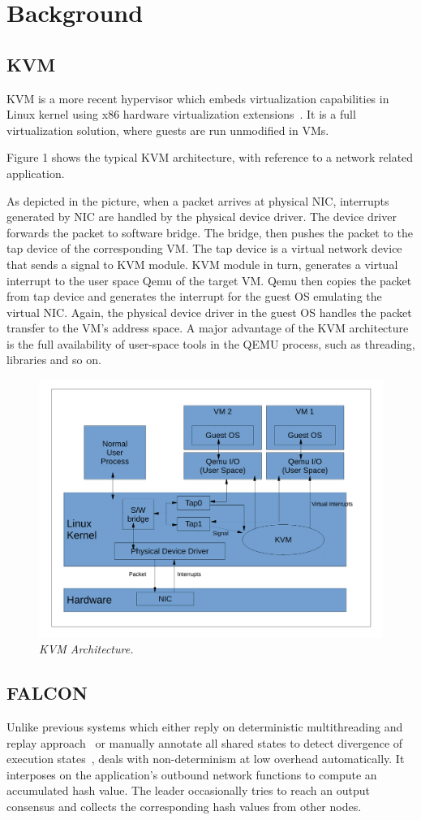 \section{Background} \label{sec:background}

\subsection{KVM} \label{sec:kvm}

KVM is a more recent hypervisor which embeds virtualization capabilities 
in Linux kernel using x86 hardware virtualization extensions~\cite{kivity2007kvm}. 
It is a full virtualization solution, where guests are run unmodified in VMs. 

Figure 1 shows the typical KVM architecture, with reference to a network related
application. 

As depicted in the picture, when a packet arrives at physical NIC,
interrupts generated by NIC are handled by the physical device driver. The device
driver forwards the packet to software bridge. The bridge, then pushes the packet
to the tap device of the corresponding VM. The tap device is a virtual network
device that sends a signal to KVM module. KVM module in turn, generates a virtual
interrupt to the user space Qemu of the target VM. Qemu then copies the packet from
tap device and generates the interrupt for the guest OS emulating the virtual NIC.
Again, the physical device driver in the guest OS handles the packet transfer to
the VM’s address space. A major advantage of the KVM architecture is the full
availability of user-space tools in the QEMU process, such as threading, libraries
and so on.

\begin{figure}[t]
\centering
\includegraphics[width=.47\textwidth]{figures/kvm}
\vspace{-.2in}
\caption{{\em KVM Architecture.}} \label{fig:kvm}
\vspace{.05in}
\end{figure}

\subsection{FALCON} \label{sec:falcon}
Unlike previous \smr systems which either reply on deterministic multithreading and replay
approach~\cite{rex:eurosys14} or manually annotate all shared states to detect divergence of 
execution states~\cite{eve:osdi12}, \smrsystem deals with non-determinism at low overhead 
automatically. It interposes on the application's outbound network functions to compute an 
accumulated hash value. The leader occasionally tries to reach an output consensus and 
collects the corresponding hash values from other nodes.
